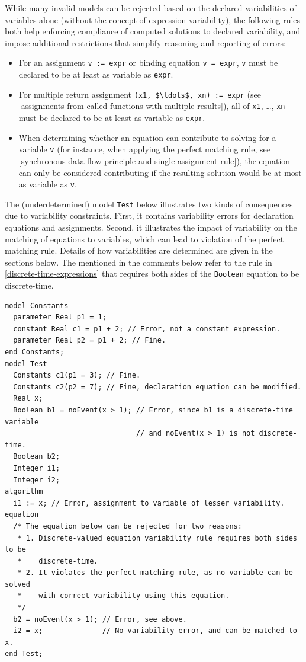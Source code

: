 While many invalid models can be rejected based on the declared variabilities of variables alone (without the concept of expression variability), the following rules both help enforcing compliance of computed solutions to declared variability, and impose additional restrictions that simplify reasoning and reporting of errors:
\begin{itemize}
\item
  For an assignment \lstinline!v := expr! or binding equation \lstinline!v = expr!, \lstinline!v! must be declared to be at least as variable as \lstinline!expr!.
\item
  For multiple return assignment \lstinline!(x1, $\ldots$, xn) := expr! (see \cref{assignments-from-called-functions-with-multiple-results}), all of \lstinline!x1!, \ldots, \lstinline!xn! must be declared to be at least as variable as \lstinline!expr!.
\item
  When determining whether an equation can contribute to solving for a variable \lstinline!v! (for instance, when applying the perfect matching rule, see \cref{synchronous-data-flow-principle-and-single-assignment-rule}), the equation can only be considered contributing if the resulting solution would be at most as variable as \lstinline!v!.
\end{itemize}

\begin{example}
The (underdetermined) model \lstinline!Test! below illustrates two kinds of consequences due to variability constraints.
First, it contains variability errors for declaration equations and assignments.
Second, it illustrates the impact of variability on the matching of equations to variables, which can lead to violation of the perfect matching rule.
Details of how variabilities are determined are given in the sections below.
The  mentioned in the comments below refer to the rule in \cref{discrete-time-expressions} that requires both sides of the \lstinline!Boolean! equation to be discrete-time.
\begin{lstlisting}[language=modelica]
model Constants
  parameter Real p1 = 1;
  constant Real c1 = p1 + 2; // Error, not a constant expression.
  parameter Real p2 = p1 + 2; // Fine.
end Constants;
model Test
  Constants c1(p1 = 3); // Fine.
  Constants c2(p2 = 7); // Fine, declaration equation can be modified.
  Real x;
  Boolean b1 = noEvent(x > 1); // Error, since b1 is a discrete-time variable
                               // and noEvent(x > 1) is not discrete-time.
  Boolean b2;
  Integer i1;
  Integer i2;
algorithm
  i1 := x; // Error, assignment to variable of lesser variability.
equation
  /* The equation below can be rejected for two reasons:
   * 1. Discrete-valued equation variability rule requires both sides to be
   *    discrete-time.
   * 2. It violates the perfect matching rule, as no variable can be solved
   *    with correct variability using this equation.
   */
  b2 = noEvent(x > 1); // Error, see above.
  i2 = x;              // No variability error, and can be matched to x.
end Test;
\end{lstlisting}
\end{example}


